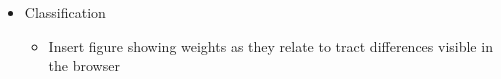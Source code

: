 \begin{itemize}
  \item Classification
    \begin{itemize}
      \item Insert figure showing weights as they relate to tract differences visible in the browser
    \end{itemize}
\end{itemize}

